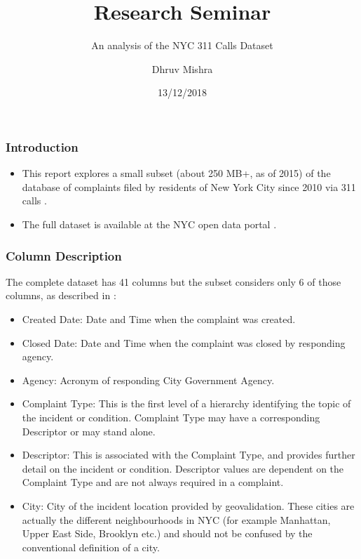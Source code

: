 \documentclass[10pt]{beamer}
\title{Research Seminar}
\subtitle{An analysis of the NYC 311 Calls Dataset}
\author{Dhruv Mishra}
\institute{Master of Science \textit{Computational Linguistics}\\
  Institut für Maschinelle Sprachverarbeitung\\
  Universität Stuttgart}
\date{13/12/2018}
\begin{document}
\frame{\titlepage}


\begin{frame} \frametitle{Introduction}

  \begin{itemize}
    \item This report explores a small subset (about 250 MB+, as of 2015) of the database of complaints filed by residents of New York City since 2010 via 311 calls \cite{subset}.
    \item The full dataset is available at the NYC open data portal \cite{nycdatafull}.
\end{itemize}

\end{frame}

\begin{frame} \frametitle{Column Description}
The complete dataset has 41 columns but the subset considers only 6 of those columns, as described in \cite{nycdatafull}:

  \begin{itemize}
    \item Created Date: Date and Time when the complaint was created.
    \item Closed Date: Date and Time when the complaint was closed by responding agency.
    \item Agency: Acronym of responding City Government Agency.
    \item Complaint Type: This is the first level of a hierarchy identifying the topic of the incident or condition. Complaint Type may have a corresponding Descriptor or may stand alone.
    \item Descriptor: This is associated with the Complaint Type, and provides further detail on the incident or condition. Descriptor values are dependent on the Complaint Type and are not always required in a complaint.
    \item City: City of the incident location provided by geovalidation. These cities are actually the different neighbourhoods in NYC (for example Manhattan, Upper East Side, Brooklyn etc.) and should not be confused by the conventional definition of a city.
\end{itemize}

\end{frame}
\end{document}
